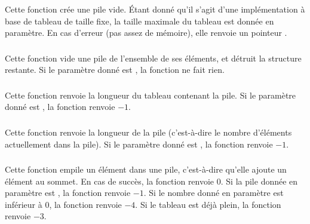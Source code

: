 \noindent Cette fonction crée une pile vide.
\'Etant donné qu'il s'agit d'une implémentation à base de tableau de taille fixe, la taille maximale du tableau est donnée en paramètre.
En cas d'erreur (pas assez de mémoire), elle renvoie un pointeur .


\subsubsection*{}

\noindent Cette fonction vide une pile de l'ensemble de ses éléments, et détruit la structure restante.
Si le paramètre donné est , la fonction ne fait rien.


\subsubsection*{}

\noindent Cette fonction renvoie la longueur du tableau contenant la pile.
Si le paramètre donné est , la fonction renvoie $ -1 $.


\subsubsection*{}

\noindent Cette fonction renvoie la longueur de la pile (c'est-à-dire le nombre d'éléments actuellement dans la pile).
Si le paramètre donné est , la fonction renvoie $ -1 $.


\subsubsection*{}

\noindent Cette fonction empile un élément dans une pile, c'est-à-dire qu'elle ajoute un élément au sommet.
En cas de succès, la fonction renvoie $ 0 $.
Si la pile donnée en paramètre est , la fonction renvoie $ -1 $.
Si le nombre donné en paramètre est inférieur à $ 0 $, la fonction renvoie $ -4 $.
Si le tableau est déjà plein, la fonction renvoie $ -3 $.


\subsubsection*{}

